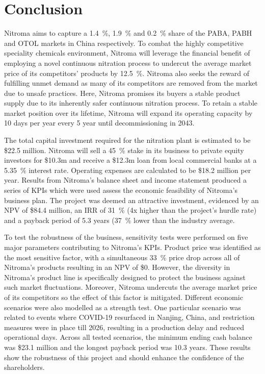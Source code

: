 \section{Conclusion}
Nitroma aims to capture a \SI{1.4}{\percent}, \SI{1.9}{\percent} and \SI{0.2}{\percent} share of the PABA, PABH and OTOL markets in China respectively. To combat the highly competitive speciality chemicals environment, Nitroma will leverage the financial benefit of employing a novel continuous nitration process to undercut the average market price of its competitors’ products by \SI{12.5}{\percent}. Nitroma also seeks the reward of fulfilling unmet demand as many of its competitors are removed from the market due to unsafe practices. Here, Nitroma promises its buyers a stable product supply due to its inherently safer continuous nitration process. To retain a stable market position over its lifetime, Nitroma will expand its operating capacity by 10 days per year every 5 year until decommissioning in 2043.

The total capital investment required for the nitration plant is estimated to be \$22.5 million. Nitroma will sell a \SI{45}{\percent} stake in its business to private equity investors for \$10.3m and receive a \$12.3m loan from local commercial banks at a \SI{5.35}{\percent} interest rate. Operating expenses are calculated to be \$18.2 million per year.  Results from Nitroma’s balance sheet and income statement produced a series of KPIs which were used assess the economic feasibility of Nitroma’s business plan. The project was deemed an attractive investment, evidenced by an NPV of \$84.4 million, an IRR of \SI{31}{\percent} (4x higher than the project’s hurdle rate) and a payback period of 5.3 years (\SI{37}{\percent} lower than the industry average.

To test the robustness of the business, sensitivity tests were performed on five major parameters contributing to Nitroma’s KPIs. Product price was identified as the most sensitive factor, with a simultaneous \SI{33}{\percent} price drop across all of Nitroma's products resulting in an NPV of \$0. However, the diversity in Nitroma’s product line is specifically designed to protect the business against such market fluctuations. Moreover, Nitroma undercuts the average market price of its competitors so the effect of this factor is mitigated. Different economic scenarios were also modelled as a strength test. One particular scenario was related to events where COVID-19 resurfaced in Nanjing, China, and restriction measures were in place till 2026, resulting in a production delay and reduced operational days. Across all tested scenarios, the minimum ending cash balance was \$23.1 million and the longest payback period was 10.3 years. These results show the robustness of this project and should enhance the confidence of the shareholders.